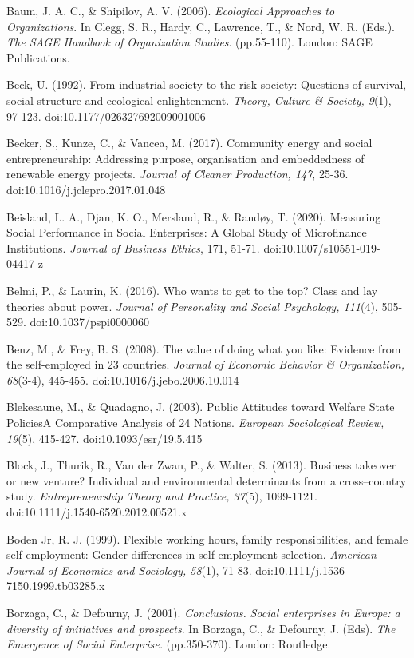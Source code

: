 \documentclass{article}
\begin{document}
Baum, J. A. C., \& Shipilov, A. V. (2006). \emph{Ecological Approaches to Organizations}. In Clegg, S. R., Hardy, C., Lawrence, T., \& Nord, W. R. (Eds.). \emph{The SAGE Handbook of Organization Studies}. (pp.55-110). London: SAGE Publications.

Beck, U. (1992). From industrial society to the risk society: Questions of survival, social structure and ecological enlightenment. \emph{Theory, Culture \& Society, 9}(1), 97-123. doi:10.1177/026327692009001006

Becker, S., Kunze, C., \& Vancea, M. (2017). Community energy and social entrepreneurship: Addressing purpose, organisation and embeddedness of renewable energy projects. \emph{Journal of Cleaner Production, 147}, 25-36. doi:10.1016/j.jclepro.2017.01.048

Beisland, L. A., Djan, K. O., Mersland, R., \& Randøy, T. (2020). Measuring Social Performance in Social Enterprises: A Global Study of Microfinance Institutions. \emph{Journal of Business Ethics}, 171, 51-71. doi:10.1007/s10551-019-04417-z

Belmi, P., \& Laurin, K. (2016). Who wants to get to the top? Class and lay theories about power. \emph{Journal of Personality and Social Psychology, 111}(4), 505-529. doi:10.1037/pspi0000060

Benz, M., \& Frey, B. S. (2008). The value of doing what you like: Evidence from the self-employed in 23 countries. \emph{Journal of Economic }\emph{Behavior}\emph{ \& Organization, 68}(3-4), 445-455. doi:10.1016/j.jebo.2006.10.014

Blekesaune, M., \& Quadagno, J. (2003). Public Attitudes toward Welfare State PoliciesA Comparative Analysis of 24 Nations. \emph{European Sociological Review, 19}(5), 415-427. doi:10.1093/esr/19.5.415

Block, J., Thurik, R., Van der Zwan, P., \& Walter, S. (2013). Business takeover or new venture? Individual and environmental determinants from a cross--country study. \emph{Entrepreneurship Theory and Practice, 37}(5), 1099-1121. doi:10.1111/j.1540-6520.2012.00521.x

Boden Jr, R. J. (1999). Flexible working hours, family responsibilities, and female self-employment: Gender differences in self-employment selection. \emph{American Journal of Economics and Sociology, 58}(1), 71-83. doi:10.1111/j.1536-7150.1999.tb03285.x

Borzaga, C., \& Defourny, J. (2001). \emph{Conclusions. }\emph{Social enterprises in Europe: a diversity of initiatives and prospects}. In Borzaga, C., \& Defourny, J. (Eds). \emph{The Emergence of Social Enterprise. }(pp.350-370). London: Routledge.
\end{document}
